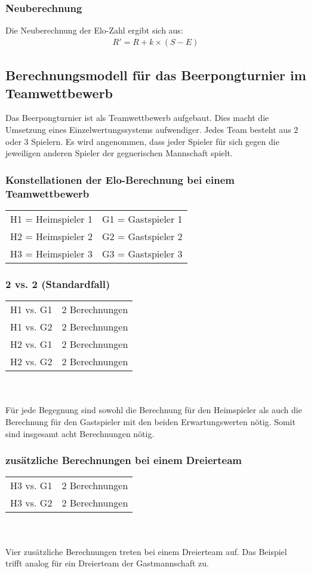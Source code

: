 \documentclass[a4paper, 12pt]{article}
\begin{document}
\subsubsection{Neuberechnung}
Die Neuberechnung der Elo-Zahl ergibt sich aus:
\begin{align}
R' = R + k\times(S-E)
\end{align}

\subsection{Berechnungsmodell für das Beerpongturnier im Teamwettbewerb}
Das Beerpongturnier ist als Teamwettbewerb aufgebaut. Dies macht die Umsetzung eines Einzelwertungssystems aufwendiger. Jedes Team besteht aus 2 oder 3 Spielern.
Es wird angenommen, dass jeder Spieler für sich gegen die jeweiligen anderen Spieler der gegnerischen Mannschaft spielt.
\subsubsection{Konstellationen der Elo-Berechnung bei einem Teamwettbewerb}
\begin{tabular}{lr}
H1 = Heimspieler 1 & G1 = Gastspieler 1 \\
H2 = Heimspieler 2 & G2 = Gastspieler 2 \\
H3 = Heimspieler 3 & G3 = Gastspieler 3 \\
\end{tabular}
\subsubsection{2 vs. 2 (Standardfall)}
\begin{tabular}[h]{ll}
H1 vs. G1 & 2 Berechnungen \\
H1 vs. G2 & 2 Berechnungen \\
H2 vs. G1 & 2 Berechnungen \\
H2 vs. G2 & 2 Berechnungen \\
\end{tabular}
\\
\\Für jede Begegnung sind sowohl die Berechnung für den Heimspieler als auch die Berechnung für den Gastspieler mit den beiden Erwartungswerten nötig. Somit sind insgesamt acht Berechnungen nötig.

\subsubsection{zusätzliche Berechnungen bei einem Dreierteam}
\begin{tabular}[h]{ll}
H3 vs. G1 & 2 Berechnungen \\
H3 vs. G2 & 2 Berechnungen \\
\end{tabular}
\\
\\Vier zusätzliche Berechnungen treten bei einem Dreierteam auf. Das Beispiel trifft analog für ein Dreierteam der Gastmannschaft zu.
\end{document}
